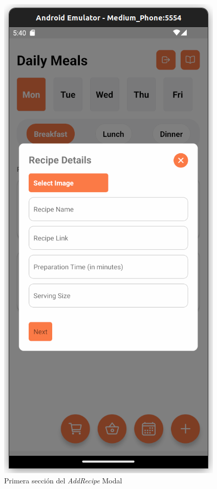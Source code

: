 \documentclass[twoside, openright, 11pt]{report}
\begin{document}
						\begin{figure}[H]
							\centering
							\includegraphics{imagenes/AddRecipeModal}
							\caption{Primera sección del \textit{AddRecipe} Modal}
							\label{fig:AddRecipeModalPrimeraParte}
						\end{figure}
						
\end{document}
